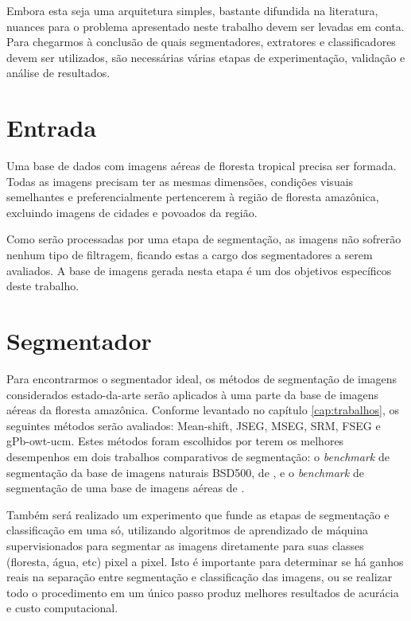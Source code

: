 Embora esta seja uma arquitetura simples, bastante difundida na literatura, nuances para o problema apresentado neste trabalho devem ser levadas em conta. Para chegarmos à conclusão de quais segmentadores, extratores e classificadores devem ser utilizados, são necessárias várias etapas de experimentação, validação e análise de resultados.

\section{Entrada}

Uma base de dados com imagens aéreas de floresta tropical precisa ser formada. Todas as imagens precisam ter as mesmas dimensões, condições visuais semelhantes e preferencialmente pertencerem à região de floresta amazônica, excluindo imagens de cidades e povoados da região.

Como serão processadas por uma etapa de segmentação, as imagens não sofrerão nenhum tipo de filtragem, ficando estas a cargo dos segmentadores a serem avaliados. A base de imagens gerada nesta etapa é um dos objetivos específicos deste trabalho.

\section{Segmentador}\label{sec:metSegmentador}

Para encontrarmos o segmentador ideal, os métodos de segmentação de imagens considerados estado-da-arte serão aplicados à uma parte da base de imagens aéreas da floresta amazônica. Conforme levantado no capítulo \ref{cap:trabalhos}, os seguintes métodos serão avaliados: Mean-shift, JSEG, MSEG, SRM, FSEG e gPb-owt-ucm. Estes métodos foram escolhidos por terem os melhores desempenhos em dois trabalhos comparativos de segmentação: o \textit{benchmark} de segmentação da base de imagens naturais BSD500, de , e o \textit{benchmark} de segmentação de uma base de imagens aéreas de .

Também será realizado um experimento que funde as etapas de segmentação e classificação em uma só, utilizando algoritmos de aprendizado de máquina supervisionados para segmentar as imagens diretamente para suas classes (floresta, água, etc) pixel a pixel. Isto é importante para determinar se há ganhos reais na separação entre segmentação e classificação das imagens, ou se realizar todo o procedimento em um único passo produz melhores resultados de acurácia e custo computacional.


